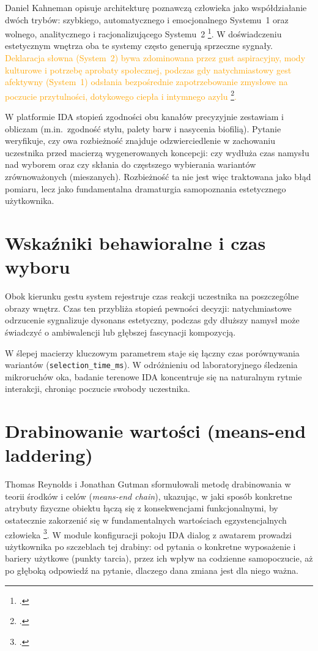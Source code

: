 Daniel Kahneman opisuje architekturę poznawczą człowieka jako współdziałanie dwóch trybów: szybkiego, automatycznego i emocjonalnego Systemu~1 oraz wolnego, analitycznego i racjonalizującego Systemu~2 \footcite{kahneman2011thinking}.
W doświadczeniu estetycznym wnętrza oba te systemy często generują sprzeczne sygnały. \textcolor{orange}{Deklaracja słowna (System~2) bywa zdominowana przez gust aspiracyjny, mody kulturowe i potrzebę aprobaty społecznej, podczas gdy natychmiastowy gest afektywny (System~1) odsłania bezpośrednie zapotrzebowanie zmysłowe na poczucie przytulności, dotykowego ciepła i intymnego azylu \footcite{pallasmaa2012oczy,bachelard1975wyobraznia}.}

W platformie IDA stopień zgodności obu kanałów precyzyjnie zestawiam i obliczam (m.in.\ zgodność stylu, palety barw i nasycenia biofilią).
Pytanie~ weryfikuje, czy owa rozbieżność znajduje odzwierciedlenie w zachowaniu uczestnika przed macierzą wygenerowanych koncepcji: czy wydłuża czas namysłu nad wyborem oraz czy skłania do częstszego wybierania wariantów zrównoważonych (mieszanych).
Rozbieżność ta nie jest więc traktowana jako błąd pomiaru, lecz jako fundamentalna dramaturgia samopoznania estetycznego użytkownika.

\section{Wskaźniki behawioralne i czas wyboru}
\label{ch03:sec:behavioral}

Obok kierunku gestu system rejestruje czas reakcji uczestnika na poszczególne obrazy wnętrz. Czas ten przybliża stopień pewności decyzji: natychmiastowe odrzucenie sygnalizuje dysonans estetyczny, podczas gdy dłuższy namysł może świadczyć o ambiwalencji lub głębszej fascynacji kompozycją.

W ślepej macierzy kluczowym parametrem staje się łączny czas porównywania wariantów (\texttt{selection\_time\_ms}). W odróżnieniu od laboratoryjnego śledzenia mikroruchów oka, badanie terenowe IDA koncentruje się na naturalnym rytmie interakcji, chroniąc poczucie swobody uczestnika.

\section{Drabinowanie wartości (means-end laddering)}
\label{ch03:sec:laddering}

Thomas Reynolds i Jonathan Gutman sformułowali metodę drabinowania w teorii środków i celów (\emph{means-end chain}), ukazując, w jaki sposób konkretne atrybuty fizyczne obiektu łączą się z konsekwencjami funkcjonalnymi, by ostatecznie zakorzenić się w fundamentalnych wartościach egzystencjalnych człowieka \footcite{reynolds1988laddering}.
W module konfiguracji pokoju IDA dialog z awatarem prowadzi użytkownika po szczeblach tej drabiny: od pytania o konkretne wyposażenie i bariery użytkowe (punkty tarcia), przez ich wpływ na codzienne samopoczucie, aż po głęboką odpowiedź na pytanie, dlaczego dana zmiana jest dla niego ważna.

